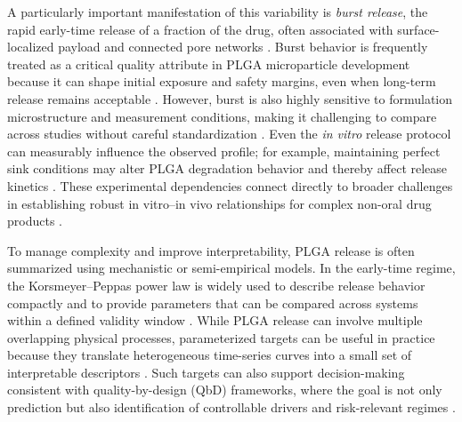 \documentclass[preprint,12pt,authoryear]{elsarticle}
\begin{document}
A particularly important manifestation of this variability is \emph{burst release}, the rapid early-time release of a fraction of the drug, often associated with surface-localized payload and connected pore networks \citep{Yoo2020Burst}. Burst behavior is frequently treated as a critical quality attribute in PLGA microparticle development because it can shape initial exposure and safety margins, even when long-term release remains acceptable \citep{Yoo2020Burst, ICHQ8R2}. However, burst is also highly sensitive to formulation microstructure and measurement conditions, making it challenging to compare across studies without careful standardization \citep{Yoo2020Burst, Fredenberg2011}. Even the \emph{in vitro} release protocol can measurably influence the observed profile; for example, maintaining perfect sink conditions may alter PLGA degradation behavior and thereby affect release kinetics \citep{Klose2011Sink}. These experimental dependencies connect directly to broader challenges in establishing robust in vitro--in vivo relationships for complex non-oral drug products \citep{ShenBurgess2015}.

To manage complexity and improve interpretability, PLGA release is often summarized using mechanistic or semi-empirical models. In the early-time regime, the Korsmeyer--Peppas power law is widely used to describe release behavior compactly and to provide parameters that can be compared across systems within a defined validity window \citep{Korsmeyer1983, RitgerPeppas1987}. While PLGA release can involve multiple overlapping physical processes, parameterized targets can be useful in practice because they translate heterogeneous time-series curves into a small set of interpretable descriptors \citep{Fredenberg2011}. Such targets can also support decision-making consistent with quality-by-design (QbD) frameworks, where the goal is not only prediction but also identification of controllable drivers and risk-relevant regimes \citep{ICHQ8R2}.
\end{document}
